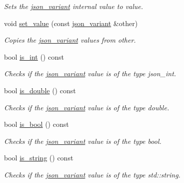 \begin{DoxyCompactItemize}
\begin{DoxyCompactList}\small\item\em Sets the \hyperlink{classJSONLIB__NAMESPACE_1_1json__variant}{json\+\_\+variant} internal value to {\ttfamily value}. \end{DoxyCompactList}\item 
\mbox{\label{classJSONLIB__NAMESPACE_1_1json__variant_a75b05acb8473015edd7f21de1656b2b1}} 
void \hyperlink{classJSONLIB__NAMESPACE_1_1json__variant_a75b05acb8473015edd7f21de1656b2b1}{set\+\_\+value} (const \hyperlink{classJSONLIB__NAMESPACE_1_1json__variant}{json\+\_\+variant} \&other)
\begin{DoxyCompactList}\small\item\em Copies the \hyperlink{classJSONLIB__NAMESPACE_1_1json__variant}{json\+\_\+variant} values from {\ttfamily other}. \end{DoxyCompactList}\item 
bool \hyperlink{classJSONLIB__NAMESPACE_1_1json__variant_a2d6f7d2f92f5c3bfaf9c548a783a97fb}{is\+\_\+int} () const
\begin{DoxyCompactList}\small\item\em Checks if the \hyperlink{classJSONLIB__NAMESPACE_1_1json__variant}{json\+\_\+variant} value is of the type {\itshape json\+\_\+int}. \end{DoxyCompactList}\item 
bool \hyperlink{classJSONLIB__NAMESPACE_1_1json__variant_a7f294ce9b078aca12e0f96df7275ff0b}{is\+\_\+double} () const
\begin{DoxyCompactList}\small\item\em Checks if the \hyperlink{classJSONLIB__NAMESPACE_1_1json__variant}{json\+\_\+variant} value is of the type {\itshape double}. \end{DoxyCompactList}\item 
bool \hyperlink{classJSONLIB__NAMESPACE_1_1json__variant_a99bd3f5d21800b7b1cc7af956c17d534}{is\+\_\+bool} () const
\begin{DoxyCompactList}\small\item\em Checks if the \hyperlink{classJSONLIB__NAMESPACE_1_1json__variant}{json\+\_\+variant} value is of the type {\itshape bool}. \end{DoxyCompactList}\item 
bool \hyperlink{classJSONLIB__NAMESPACE_1_1json__variant_ae097a22fe419dd083ff07bfebf0e8151}{is\+\_\+string} () const
\begin{DoxyCompactList}\small\item\em Checks if the \hyperlink{classJSONLIB__NAMESPACE_1_1json__variant}{json\+\_\+variant} value is of the type {\itshape std\+::string}. \end{DoxyCompactList}\item 

\end{DoxyCompactItemize}
